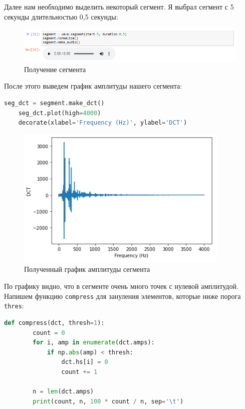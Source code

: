 \documentclass[a4paper]{article}
\begin{document}
            Далее нам необходимо выделить некоторый сегмент. Я выбрал сегмент с 5 секунды длительностью 0,5 секунды:
            
            \begin{figure}[H]
                \centering
                \includegraphics[width=\textwidth]{ex_2_segment.png}
                \caption{Получение сегмента}
                \label{fig:ex_2_segment}
            \end{figure}
            
            После этого выведем график амплитуды нашего сегмента:
            
\begin{lstlisting}[language=Python, caption= Полученние графика амплитуды сегмента]
    seg_dct = segment.make_dct()
    seg_dct.plot(high=4000)
    decorate(xlabel='Frequency (Hz)', ylabel='DCT')
\end{lstlisting}               
            
            \begin{figure}[H]
                \centering
                \includegraphics{ex_2_segment_dct.png} 
                \caption{Полученный график амплитуды сегмента}
                \label{fig:ex_2_segment_dct}
            \end{figure}
            
            По графику видно, что в сегменте очень много точек с нулевой амплитудой. Напишем функцию \texttt{compress} для зануления элементов, которые ниже порога \texttt{thres}:
            
\begin{lstlisting}[language=Python, caption= Функция \texttt{compress}]
    def compress(dct, thresh=1):
        count = 0
        for i, amp in enumerate(dct.amps):
            if np.abs(amp) < thresh:
                dct.hs[i] = 0
                count += 1
                
        n = len(dct.amps)
        print(count, n, 100 * count / n, sep='\t')
\end{lstlisting}      
            
\end{document}
